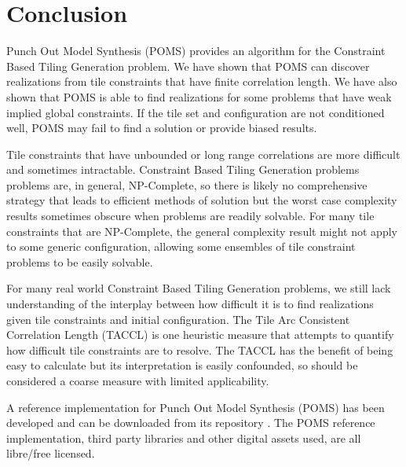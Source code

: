\section{Conclusion}

Punch Out Model Synthesis (POMS) provides an algorithm for the Constraint Based Tiling Generation problem.
We have shown that POMS can discover realizations from tile constraints that have finite correlation length.
We have also shown that POMS is able to find realizations for some problems
that have weak implied global constraints.
If the tile set and configuration are not conditioned well,
POMS may fail to find a solution or provide biased results.

Tile constraints that have unbounded or long range correlations are more difficult and sometimes intractable.
Constraint Based Tiling Generation problems problems are, in general, NP-Complete, so there is likely
no comprehensive strategy that leads to efficient methods of solution but the worst case complexity
results sometimes obscure when problems are readily solvable.
For many tile constraints that are NP-Complete, the general complexity result might not
apply to some generic configuration, allowing some ensembles of tile constraint problems
to be easily solvable.

For many real world Constraint Based Tiling Generation problems, we still lack understanding of the
interplay between how difficult it is to find realizations given tile constraints
and initial configuration.
The Tile Arc Consistent Correlation Length (TACCL) is one heuristic measure that attempts
to quantify how difficult tile constraints are to resolve.
The TACCL has the benefit of being easy to calculate but its interpretation is easily confounded,
so should be considered a coarse measure with limited applicability.

A reference implementation for Punch Out Model Synthesis (POMS) has been developed and can be downloaded
from its repository .
The POMS reference implementation, third party libraries and other digital assets used, are all libre/free licensed.

